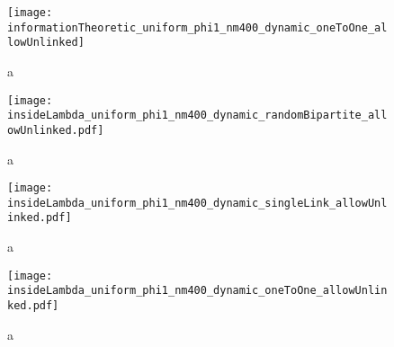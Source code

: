 \begin{figure}
  \centering
  \texttt{[image: informationTheoretic\_uniform\_phi1\_nm400\_dynamic\_oneToOne\_allowUnlinked]}
  \caption{a}
  \label{fig:informationTheoretic_uniform_phi1_nm400_dynamic_oneToOne_allowUnlinked}
\end{figure}

\begin{figure}
  \centering
  \texttt{[image: insideLambda\_uniform\_phi1\_nm400\_dynamic\_randomBipartite\_allowUnlinked.pdf]}
  \caption{a}
  \label{fig:insideLambda_uniform_phi1_nm400_dynamic_randomBipartite_allowUnlinked}
\end{figure}

\begin{figure}
  \centering
  \texttt{[image: insideLambda\_uniform\_phi1\_nm400\_dynamic\_singleLink\_allowUnlinked.pdf]}
  \caption{a}
  \label{fig:insideLambda_uniform_phi1_nm400_dynamic_singleLink_allowUnlinked}
\end{figure}

\begin{figure}
  \centering
  \texttt{[image: insideLambda\_uniform\_phi1\_nm400\_dynamic\_oneToOne\_allowUnlinked.pdf]}
  \caption{a}
  \label{fig:insideLambda_uniform_phi1_nm400_dynamic_oneToOne_allowUnlinked}
\end{figure}

